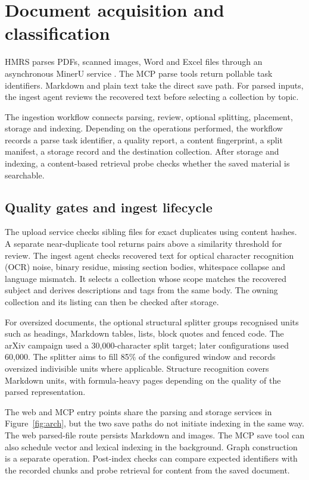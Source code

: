 \section{Document acquisition and classification}
\label{sec:acquisition}

HMRS parses PDFs, scanned images, Word and Excel files through
an asynchronous MinerU service \citep{mineru}. The MCP parse tools return
pollable task identifiers. Markdown and plain text take the direct save
path. For parsed inputs, the ingest agent reviews the recovered text
before selecting a collection by topic.

The ingestion workflow connects parsing, review, optional splitting,
placement, storage and indexing. Depending on the operations performed,
the workflow records a parse task identifier, a quality report, a
content fingerprint, a split manifest, a storage record and the
destination collection. After storage and indexing, a content-based retrieval probe
checks whether the saved material is searchable.

\subsection{Quality gates and ingest lifecycle}

The upload service checks sibling files for exact duplicates using content
hashes. A separate near-duplicate tool returns pairs above a similarity
threshold for review. The ingest agent checks recovered text for
optical character recognition (OCR) noise,
binary residue, missing section bodies, whitespace collapse and language
mismatch. It selects a collection whose scope matches the recovered subject and
derives descriptions and tags from the same body. The owning collection and
its listing can then be checked after storage.

For oversized documents, the optional structural splitter groups recognised
units such as headings, Markdown tables, lists, block quotes and fenced code.
The arXiv campaign used a 30,000-character split target; later configurations used
60,000. The splitter aims to fill 85\% of the configured window and records
oversized indivisible units where applicable. Structure recognition covers
Markdown units, with formula-heavy pages depending on the quality of the
parsed representation.

The web and MCP entry points share the parsing and storage services in
Figure~\ref{fig:arch}, but the two save paths do not initiate indexing in
the same way. The web parsed-file route persists Markdown and images. The
MCP save tool can also schedule vector and lexical indexing in the
background. Graph construction is a separate operation. Post-index checks
can compare expected identifiers with the recorded chunks and probe
retrieval for content from the saved document.
